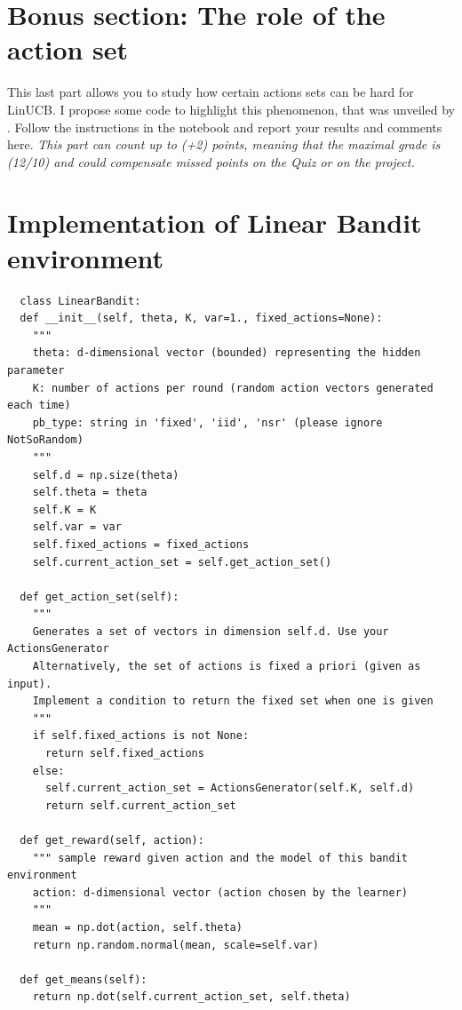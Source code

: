 
\newpage





\appendix

\section{Bonus section: The role of the action set}

This last part allows you to study how certain actions sets can be hard for LinUCB. I propose some code to highlight this phenomenon, that was unveiled by \citet{lattimore2017end}. 
Follow the instructions in the notebook and report your results and comments here. 
\emph{This part can count up to (+2) points, meaning that the maximal grade is (12/10) and could compensate missed points on the Quiz or on the project. }

\section{Implementation of \textbf{Linear Bandit} environment}
\begin{verbatim}
  class LinearBandit:
  def __init__(self, theta, K, var=1., fixed_actions=None):
    """
    theta: d-dimensional vector (bounded) representing the hidden parameter
    K: number of actions per round (random action vectors generated each time)
    pb_type: string in 'fixed', 'iid', 'nsr' (please ignore NotSoRandom)
    """
    self.d = np.size(theta)
    self.theta = theta
    self.K = K
    self.var = var
    self.fixed_actions = fixed_actions
    self.current_action_set = self.get_action_set()

  def get_action_set(self):
    """
    Generates a set of vectors in dimension self.d. Use your ActionsGenerator
    Alternatively, the set of actions is fixed a priori (given as input).
    Implement a condition to return the fixed set when one is given
    """
    if self.fixed_actions is not None:
      return self.fixed_actions
    else:
      self.current_action_set = ActionsGenerator(self.K, self.d)
      return self.current_action_set

  def get_reward(self, action):
    """ sample reward given action and the model of this bandit environment
    action: d-dimensional vector (action chosen by the learner)
    """
    mean = np.dot(action, self.theta)
    return np.random.normal(mean, scale=self.var)

  def get_means(self):
    return np.dot(self.current_action_set, self.theta)
\end{verbatim}


